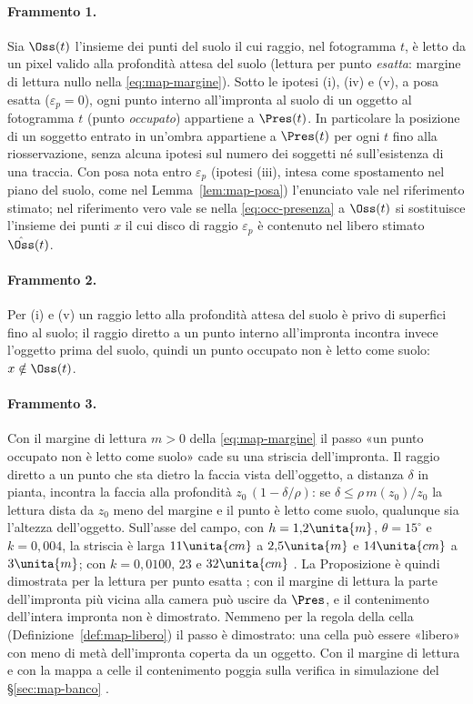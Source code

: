 

\paragraph{Frammento 1.}
\begin{proposizione}[Contenimento]\label{prop:occ-contenimento}
Sia $\Oss(t)$ l'insieme dei punti del suolo il cui raggio, nel fotogramma $t$, è letto da un pixel valido alla profondità attesa del suolo (lettura per punto \emph{esatta}: margine di lettura nullo nella \eqref{eq:map-margine}). Sotto le ipotesi (i), (iv) e (v), a posa esatta ($\varepsilon_p=0$), ogni punto interno all'impronta al suolo di un oggetto al fotogramma $t$ (punto \emph{occupato}) appartiene a $\Pres(t)$. In particolare la posizione di un soggetto entrato in un'ombra appartiene a $\Pres(t)$ per ogni $t$ fino alla riosservazione, senza alcuna ipotesi sul numero dei soggetti né sull'esistenza di una traccia. Con posa nota entro $\varepsilon_p$ (ipotesi (iii), intesa come spostamento nel piano del suolo, come nel Lemma~\ref{lem:map-posa}) l'enunciato vale nel riferimento stimato; nel riferimento vero vale se nella \eqref{eq:occ-presenza} a $\Oss(t)$ si sostituisce l'insieme dei punti $x$ il cui disco di raggio $\varepsilon_p$ è contenuto nel libero stimato $\hat{\Oss}(t)$. 
\end{proposizione}

\paragraph{Frammento 2.}
Per (i) e (v) un raggio letto alla profondità attesa del suolo è privo di superfici fino al suolo; il raggio diretto a un punto interno all'impronta incontra invece l'oggetto prima del suolo, quindi un punto occupato non è letto come suolo: $x\notin\Oss(t)$.

\paragraph{Frammento 3.}
Con il margine di lettura $m>0$ della \eqref{eq:map-margine} il passo «un punto occupato non è letto come suolo» cade su una striscia dell'impronta. Il raggio diretto a un punto che sta dietro la faccia vista dell'oggetto, a distanza $\delta$ in pianta, incontra la faccia alla profondità $z_0\,(1-\delta/\rho)$: se $\delta\le\rho\,m(z_0)/z_0$ la lettura dista da $z_0$ meno del margine e il punto è letto come suolo, qualunque sia l'altezza dell'oggetto. Sull'asse del campo, con $h=1{,}2\unita{m}$, $\theta=15^\circ$ e $k=0{,}004$, la striscia è larga $11\unita{cm}$ a $2{,}5\unita{m}$ e $14\unita{cm}$ a $3\unita{m}$; con $k=0{,}0100$, $23$ e $32\unita{cm}$ . La Proposizione è quindi dimostrata per la lettura per punto esatta ; con il margine di lettura la parte dell'impronta più vicina alla camera può uscire da $\Pres$, e il contenimento dell'intera impronta non è dimostrato. Nemmeno per la regola della cella (Definizione~\ref{def:map-libero}) il passo è dimostrato: una cella può essere «libero» con meno di metà dell'impronta coperta da un oggetto. Con il margine di lettura e con la mappa a celle il contenimento poggia sulla verifica in simulazione del \S\ref{sec:map-banco} .

